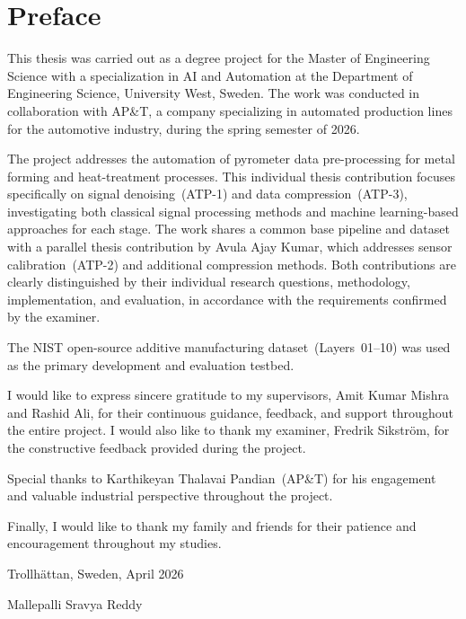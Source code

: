 \section*{Preface}
\vspace{-2ex}\titlerule\vspace{4ex}

This thesis was carried out as a degree project for the Master of Engineering Science with a specialization in AI and Automation at the Department of Engineering Science, University West, Sweden. The work was conducted in collaboration with AP\&T, a company specializing in automated production lines for the automotive industry, during the spring semester of 2026.

The project addresses the automation of pyrometer data pre-processing for metal forming and heat-treatment processes. This individual thesis contribution focuses specifically on signal denoising~(ATP-1) and data compression~(ATP-3), investigating both classical signal processing methods and machine learning-based approaches for each stage. The work shares a common base pipeline and dataset with a parallel thesis contribution by Avula Ajay Kumar, which addresses sensor calibration~(ATP-2) and additional compression methods. Both contributions are clearly distinguished by their individual research questions, methodology, implementation, and evaluation, in accordance with the requirements confirmed by the examiner.

The NIST open-source additive manufacturing dataset~(Layers~01--10) was used as the primary development and evaluation testbed.

I would like to express sincere gratitude to my supervisors, Amit Kumar Mishra and Rashid Ali, for their continuous guidance, feedback, and support throughout the entire project. I would also like to thank my examiner, Fredrik Sikstr\"{o}m, for the constructive feedback provided during the project.

Special thanks to Karthikeyan Thalavai Pandian~(AP\&T) for his engagement and valuable industrial perspective throughout the project.

Finally, I would like to thank my family and friends for their patience and encouragement throughout my studies.

\vspace{1cm}
Trollh\"{a}ttan, Sweden, April 2026

\vspace{1cm}
Mallepalli Sravya Reddy
